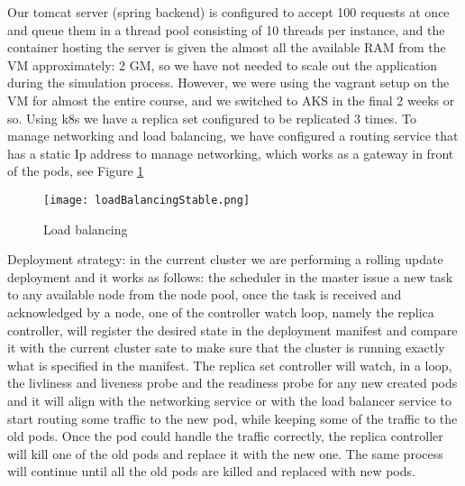 Our tomcat server (spring backend) is configured to accept 100 requests at once and queue them in a thread pool consisting of 10 threads per instance, and the container hosting the server is given the almost all the available RAM from the VM approximately: 2 GM, so we have not needed to scale out the application during the simulation process. However, we were using the vagrant setup on the VM for almost the entire course, and we switched to AKS in the final 2 weeks or so. Using k8s we have a replica set configured to be replicated 3 times. To manage networking and load balancing, we have configured a routing service that has a static Ip address to manage networking, which works as a gateway in front of the pods, see Figure \ref{fig:loadBalancingStable}

\begin{figure}[h]
    \centering
    \texttt{[image: loadBalancingStable.png]}
    \caption{Load balancing \cite{https://kubernetes.io/KubernetesKubernetes}}
    \label{fig:loadBalancingStable}
\end{figure}

Deployment strategy: in the current cluster we are performing a rolling update deployment and it works as follows: the scheduler in the master issue a new task to any available node from the node pool, once the task is received and acknowledged by a node, one of the controller watch loop, namely the replica controller, will register the desired state in the deployment manifest and compare it with the current cluster sate to make sure that the cluster is running exactly what is specified in the manifest. The replica set controller will watch, in a loop, the livliness and liveness probe and the readiness probe for any new created pods and it will align with the networking service or with the load balancer service to start routing some traffic to the new pod, while keeping some of the traffic to the old pods. Once the pod could handle the traffic correctly, the replica controller will kill one of the old pods and replace it with the new one. The same process will continue until all the old pods are killed and replaced with new pods.

